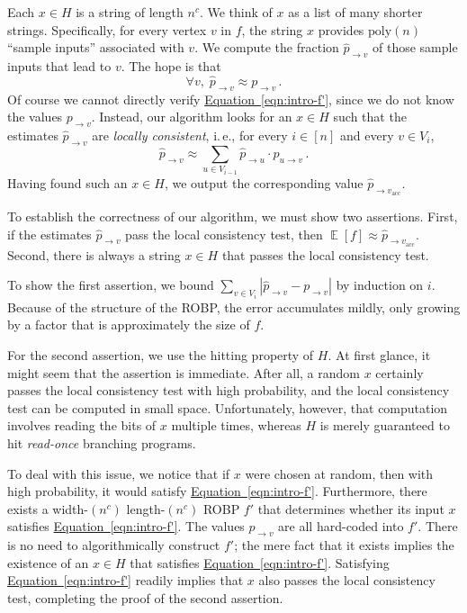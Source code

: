 \documentclass[11pt]{article}
\numberwithin{equation}{section}
\theoremstyle{definition}
\theoremstyle{plain}
\newcommand{\ie}{i.\,e.}
\newcommand{\expeqref}[2]{\hyperref[#2]{#1~\eqref{#2}}}
\DeclareMathOperator*{\ExpVal}{\mathbb{E}}
\begin{document}
Each $x \in H$ is a string of length $n^c$. We think of $x$ as a list of many shorter strings. Specifically, for every vertex $v$ in $f$, the string $x$ provides $\text{poly}(n)$ ``sample inputs'' associated with $v$. We compute the fraction $\widehat{p}_{\to v}$ of those sample inputs that lead to $v$. The hope is that
\begin{equation} \label{eqn:intro-f'} 
\forall v, \; \widehat{p}_{\rightarrow v} \approx p_{\to v}\,.
\end{equation}
Of course we cannot directly verify \expeqref{Equation}{eqn:intro-f'}, since we do not know the values $p_{\to v}$. Instead, our algorithm looks for an $x \in H$ such that the estimates $\widehat{p}_{\to v}$ are  \emph{locally consistent}, \ie, for every $i \in [n]$ and every $v \in V_i$,
$$
\widehat{p}_{\to v} \approx \sum_{u \in V_{i - 1}} \widehat{p}_{\to u} \cdot p_{u \to v}\,.
$$
Having found such an $x \in H$, we output the corresponding value $\widehat{p}_{\to v_{\text{acc}}}$.

To establish the correctness of our algorithm, we must show two assertions. First, if the estimates $\widehat{p}_{\to v}$ pass the local consistency test, then $\ExpVal[f] \approx \widehat{p}_{\to v_{\text{acc}}}$. Second, there is always a string $x\in H$ that passes the local consistency test.

To show the first assertion, we bound $\sum_{v \in V_i} |\widehat{p}_{\to v} - p_{\to v}|$ by induction on $i$. Because of the structure of the ROBP, the error accumulates mildly, only growing by a factor that is approximately the size of $f$.

For the second assertion, we use the hitting property of $H$. At first glance, it might seem that the assertion is immediate. After all, a random $x$ certainly passes the local consistency test with high probability, and the local consistency test can be computed in small space. Unfortunately, however, that computation involves reading the bits of $x$ multiple times, whereas $H$ is merely guaranteed to hit \emph{read-once} branching programs.

To deal with this issue, we notice that if $x$ were chosen at random, then with high probability, it would satisfy \expeqref{Equation}{eqn:intro-f'}. Furthermore, there exists a width-$(n^c)$ length-$(n^c)$ ROBP $f'$ that determines whether its input $x$ satisfies \expeqref{Equation}{eqn:intro-f'}. The values $p_{\to v}$ are all hard-coded into $f'$. There is no need to algorithmically construct $f'$; the mere fact that it exists implies the existence of an $x \in H$ that satisfies \expeqref{Equation}{eqn:intro-f'}. Satisfying \expeqref{Equation}{eqn:intro-f'} readily implies that $x$ also passes the local consistency test, completing the proof of the second assertion.
\end{document}
